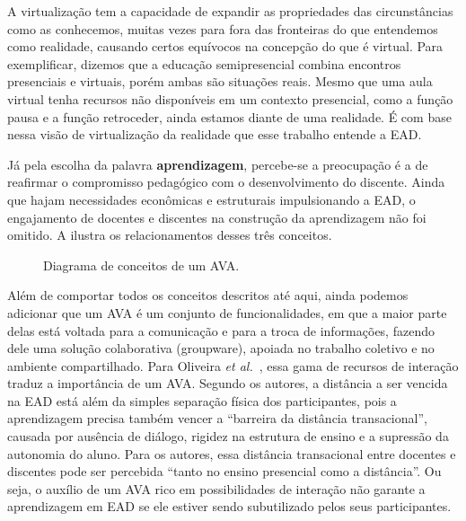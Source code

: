 A virtualização tem a capacidade de expandir as propriedades das circunstâncias como as conhecemos, muitas vezes para fora das fronteiras do que entendemos como realidade, causando certos equívocos na concepção do que é virtual. Para exemplificar, dizemos que a educação semipresencial combina encontros presenciais e virtuais, porém ambas são situações reais. Mesmo que uma aula virtual tenha recursos não disponíveis em um contexto presencial, como a função pausa e a função retroceder, ainda estamos diante de uma realidade. É com base nessa visão de virtualização da realidade que esse trabalho entende a EAD.

Já pela escolha da palavra \textbf{aprendizagem}, percebe-se a preocupação é a de reafirmar o compromisso pedagógico com o desenvolvimento do discente. Ainda que hajam necessidades econômicas e estruturais impulsionando a EAD, o engajamento de docentes e discentes na construção da aprendizagem não foi omitido. A  ilustra os  relacionamentos desses três conceitos.
\begin{figure}[h]
    \centering
    \caption{Diagrama de conceitos de um AVA.}
    \label{fig:ava}
\end{figure}  

Além de comportar todos os conceitos descritos até aqui, ainda podemos adicionar que um AVA é um conjunto de funcionalidades, em que a maior parte delas está  voltada para a comunicação e para a troca de informações, fazendo dele uma solução colaborativa (groupware), apoiada no trabalho coletivo e no ambiente compartilhado. Para Oliveira \textit{et al.}~\cite{dotta@ead}, essa gama de recursos de interação traduz a importância de um AVA. Segundo os autores, a distância a ser vencida na EAD está além da simples separação física dos participantes, pois a aprendizagem precisa também vencer a ``barreira da distância transacional'', causada por ausência de diálogo, rigidez na estrutura de ensino e a supressão da autonomia do aluno. Para os autores, essa distância transacional entre docentes e discentes pode ser percebida ``tanto no ensino presencial como a distância''. Ou seja, o auxílio de um AVA rico em possibilidades de interação não garante a aprendizagem em EAD se ele estiver sendo subutilizado pelos seus participantes.

